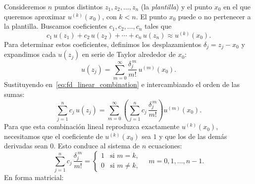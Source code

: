 Consideremos $n$ puntos distintos $z_1, z_2, \ldots, z_n$ (la \textit{plantilla}) y el punto $x_0$ en el que queremos
aproximar $u^{(k)}(x_0)$, con $k < n$. El punto $x_0$ puede o no pertenecer a la plantilla. Buscamos coeficientes
$c_1, c_2, \ldots, c_n$ tales que
\begin{equation}
    c_1\,u(z_1) + c_2\,u(z_2) + \cdots + c_n\,u(z_n) \approx u^{(k)}(x_0).
    \label{eq:fd_linear_combination}
\end{equation}
Para determinar estos coeficientes, definimos los desplazamientos $\delta_j = z_j - x_0$ y expandimos cada $u(z_j)$ en
serie de Taylor alrededor de $x_0$:
\begin{equation}
    u(z_j) = \sum_{m=0}^{\infty} \frac{\delta_j^{\,m}}{m!}\,u^{(m)}(x_0).
    \label{eq:taylor_general}
\end{equation}
Sustituyendo en~\eqref{eq:fd_linear_combination} e intercambiando el orden de las sumas:
\begin{equation}
    \sum_{j=1}^{n} c_j\,u(z_j) = \sum_{m=0}^{\infty} \left(\sum_{j=1}^{n} c_j\,\frac{\delta_j^{\,m}}{m!}\right) u^{(m)}(x_0).
    \label{eq:fd_expansion}
\end{equation}
Para que esta combinación lineal reproduzca exactamente $u^{(k)}(x_0)$, necesitamos que el coeficiente de
$u^{(k)}(x_0)$ sea $1$ y que los de las demás derivadas sean $0$. Esto conduce al sistema de $n$ ecuaciones:
\begin{equation}
    \sum_{j=1}^{n} c_j\,\frac{\delta_j^{\,m}}{m!} =
    \begin{cases}
        1 & \text{si } m = k,  \\
        0 & \text{si } m \neq k,
    \end{cases}
    \quad m = 0, 1, \ldots, n-1.
    \label{eq:vandermonde_system}
\end{equation}
En forma matricial:
